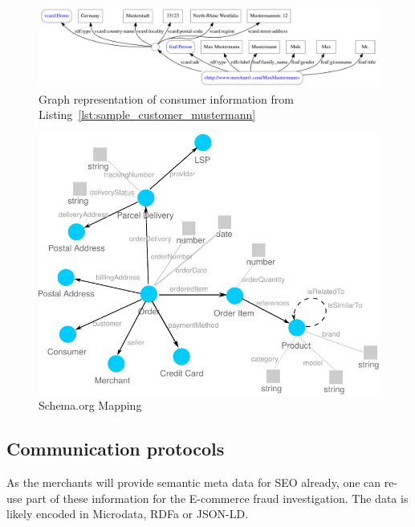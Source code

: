 
\begin{figure}[H]
	\centering
		\includegraphics[width=\columnwidth]{images/sample_customer_mustermann.pdf}
	\caption{Graph representation of consumer information from Listing~\ref{lst:sample_customer_mustermann}}
\label{fig:images_sample_customer}
\end{figure}


\begin{figure}[H]
	\centering
		\includegraphics[width=0.8\columnwidth]{images/schema_org_mapping.pdf}
	\caption{Schema.org Mapping}
\label{fig:images_schema_org}
\end{figure}


\subsection{Communication protocols}
\label{subsec:comm_protocol}

As the merchants will provide semantic meta data for \gls{SEO} already, one can re-use part of these information for the E-commerce fraud investigation. The data is likely encoded in Microdata, \gls{RDFa} or \gls{JSON-LD}. \\

